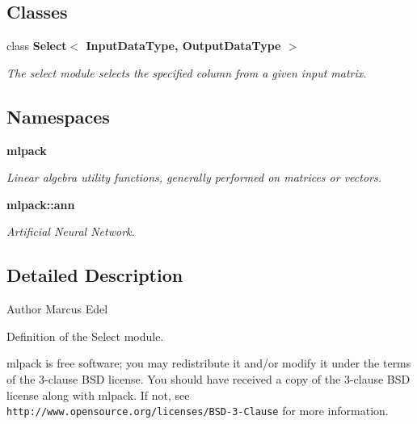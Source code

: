 \subsection*{Classes}
\begin{DoxyCompactItemize}
\item 
class \textbf{ Select$<$ Input\+Data\+Type, Output\+Data\+Type $>$}
\begin{DoxyCompactList}\small\item\em The select module selects the specified column from a given input matrix. \end{DoxyCompactList}\end{DoxyCompactItemize}
\subsection*{Namespaces}
\begin{DoxyCompactItemize}
\item 
 \textbf{ mlpack}
\begin{DoxyCompactList}\small\item\em Linear algebra utility functions, generally performed on matrices or vectors. \end{DoxyCompactList}\item 
 \textbf{ mlpack\+::ann}
\begin{DoxyCompactList}\small\item\em Artificial Neural Network. \end{DoxyCompactList}\end{DoxyCompactItemize}


\subsection{Detailed Description}
\begin{DoxyAuthor}{Author}
Marcus Edel
\end{DoxyAuthor}
Definition of the Select module.

mlpack is free software; you may redistribute it and/or modify it under the terms of the 3-\/clause B\+SD license. You should have received a copy of the 3-\/clause B\+SD license along with mlpack. If not, see {\tt http\+://www.\+opensource.\+org/licenses/\+B\+S\+D-\/3-\/\+Clause} for more information. 